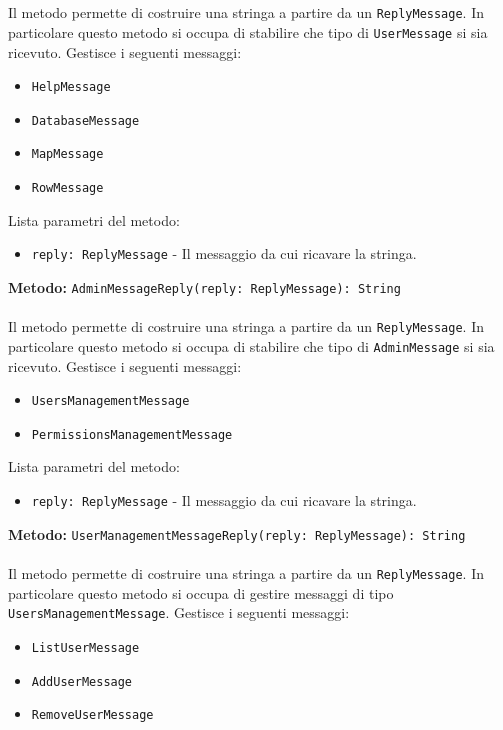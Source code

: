 \documentclass[a4paper]{article}
\begin{document}
			\\ \\
			Il metodo permette di costruire una stringa a partire da un \texttt{ReplyMessage}. In particolare questo metodo si occupa di stabilire che tipo di \texttt{UserMessage} si sia ricevuto.
			Gestisce i seguenti messaggi:
			\begin{itemize}
				\item \texttt{HelpMessage}
				\item \texttt{DatabaseMessage}
				\item \texttt{MapMessage}
				\item \texttt{RowMessage}
			\end{itemize}
			Lista parametri del metodo:
			\begin{itemize}
				\item \texttt{reply: ReplyMessage} - Il messaggio da cui ricavare la stringa.
			\end{itemize}
		\textbf{Metodo: }\texttt{AdminMessageReply(reply: ReplyMessage): String}
			\\ \\
			Il metodo permette di costruire una stringa a partire da un \texttt{ReplyMessage}. In particolare questo metodo si occupa di stabilire che tipo di \texttt{AdminMessage} si sia ricevuto.
			Gestisce i seguenti messaggi:
			\begin{itemize}
				\item \texttt{UsersManagementMessage}
				\item \texttt{PermissionsManagementMessage}
			\end{itemize}
			Lista parametri del metodo:
			\begin{itemize}
				\item \texttt{reply: ReplyMessage} - Il messaggio da cui ricavare la stringa.
			\end{itemize}
		\textbf{Metodo: }\texttt{UserManagementMessageReply(reply: ReplyMessage): String}
			\\ \\
			Il metodo permette di costruire una stringa a partire da un \texttt{ReplyMessage}. In particolare questo metodo si occupa di gestire messaggi di tipo \texttt{UsersManagementMessage}.
			Gestisce i seguenti messaggi:
			\begin{itemize}
				\item \texttt{ListUserMessage}
				\item \texttt{AddUserMessage}
				\item \texttt{RemoveUserMessage}
			\end{itemize}
\end{document}

